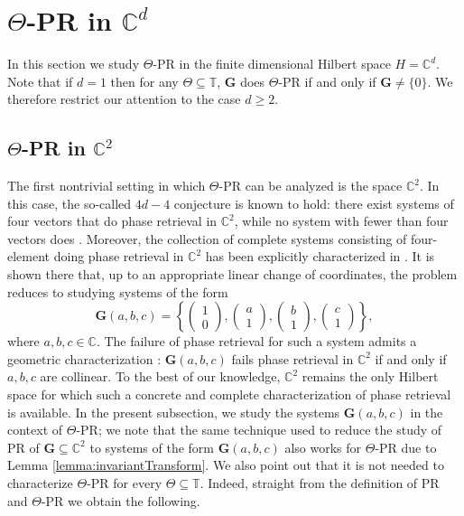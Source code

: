 \documentclass[reqno,a4paper,11pt]{amsart}
\numberwithin{equation}{section}
\def\T{{\mathbb T}}
\def\C{{\mathbb C}}
\newcommand{\Cd}{{\C^d}}
\newcommand\1{\mathds{1}}
\begin{document}
\section{$\Theta$-PR in $\Cd$}

In this section we study $\Theta$-PR in the finite dimensional Hilbert space $H=\C^d$. Note that if $d=1$ then for any $\Theta\subseteq \T$, $\mathbf{G}$ does $\Theta$-PR if and only if $\mathbf{G}\neq \{0\}$. We therefore restrict our attention to the case $d\geq 2$.

\subsection{$\Theta$-PR in $\C^2$}\label{sec:c2_characterization}

The first nontrivial setting in which $\Theta$-PR can be analyzed is the space $\C^2$. In this case, the so-called $4d - 4$ conjecture is known to hold: there exist systems of four vectors that do phase retrieval in $\C^2$, while no system with fewer than four vectors does \cite[Theorem 10]{bandeira2014saving}. Moreover, the collection of complete systems consisting of four-element doing phase retrieval in $\C^2$ has been explicitly characterized in \cite{grohs2025multi}. It is shown there that, up to an appropriate linear change of coordinates, the problem reduces to studying systems of the form
\begin{equation}
        \mathbf{G}(a,b,c) =\left \{  
             \begin{pmatrix}
               1 \\
               0 
             \end{pmatrix},    
             \begin{pmatrix}
               a \\
               1 
               \end{pmatrix},
               \begin{pmatrix}
               b \\
               1 
               \end{pmatrix},\begin{pmatrix}
               c \\
               1 
               \end{pmatrix}
               \right \},
\end{equation}
where $a,b,c \in \C$. The failure of phase retrieval for such a system admits a geometric characterization \cite[Theorem 1.4]{grohs2025multi}: $\mathbf{G}(a,b,c)$ fails phase retrieval in $\C^2$ if and only if $a,b,c$ are collinear. To the best of our knowledge, $\C^2$ remains the only Hilbert space for which such a concrete and complete characterization of phase retrieval is available. In the present subsection, we study the systems $\mathbf{G}(a,b,c)$ in the context of $\Theta$-PR; we note that the same technique used to reduce the study of PR of $\mathbf{G}\subseteq \C^2$ to systems of the form $\mathbf{G}(a,b,c)$ also works for $\Theta$-PR due to Lemma \ref{lemma:invariantTransform}. We also point out that it is not needed to characterize $\Theta$-PR for every $\Theta\subseteq\T$. Indeed, straight from the definition of PR and $\Theta$-PR we obtain the following.
\end{document}
